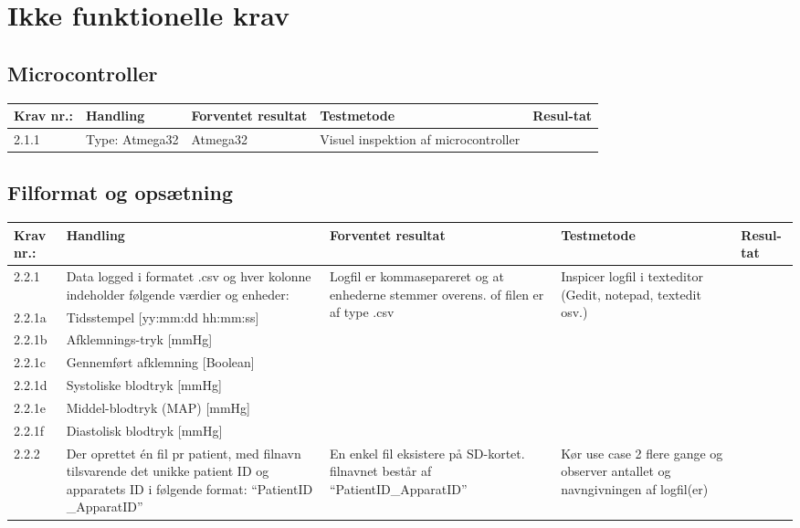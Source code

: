 \documentclass[11pt]{article}
\begin{document}
	\section{Ikke funktionelle krav}
			\subsection{Microcontroller}
			\begin{center}
				\begin{longtable}{|p{1.5cm}|p{2cm}|p{3cm}|p{3cm}|p{1.1cm}|}
					\hline
					Krav nr.: & Handling & Forventet resultat & Testmetode & Resul-tat  \\\hline
					 2.1.1 & Type: Atmega32 & Atmega32 & Visuel inspektion af microcontroller & \\ \hline
				\end{longtable}
			\end{center}
			
			\subsection{Filformat og opsætning}
			\begin{center}
				\begin{longtable}{|p{1.5cm}|p{2cm}|p{3cm}|p{3cm}|p{1.1cm}|}
					\hline
					Krav nr.: & Handling & Forventet resultat & Testmetode & Resul-tat  \\\hline
					2.2.1 & Data logged i formatet .csv og hver kolonne indeholder følgende værdier og enheder:  & \multirow{7}{3cm}{Logfil er kommasepareret og at enhederne stemmer overens. of filen er af type .csv }&  \multirow{7}{3cm}{Inspicer logfil i texteditor (Gedit, notepad, textedit osv.)}& \multirow{7}{3cm}{} \\ \cline{1-2}
					2.2.1a& Tidsstempel [yy:mm:dd hh:mm:ss] & &  & \\ \cline{1-2}
					2.2.1b& Afklemnings-tryk [mmHg] & &  & \\ \cline{1-2}
					2.2.1c&  Gennemført afklemning [Boolean] & &  & \\ \cline{1-2}
					2.2.1d&  Systoliske blodtryk [mmHg] & &  & \\ \cline{1-2}
					2.2.1e&  Middel-blodtryk (MAP) [mmHg] & &  & \\ \cline{1-2}
					2.2.1f&  Diastolisk blodtryk [mmHg]  & &  & \\ \hline
					2.2.2 & Der oprettet én fil pr patient, med filnavn tilsvarende det unikke patient ID og apparatets ID i følgende format: “PatientID \_ApparatID”  & En enkel fil eksistere på SD-kortet. filnavnet består af “PatientID\_ApparatID” & Kør use case 2 flere gange og observer antallet og navngivningen af logfil(er)  & \\ \hline

				\end{longtable}
			\end{center}
			
\end{document}
